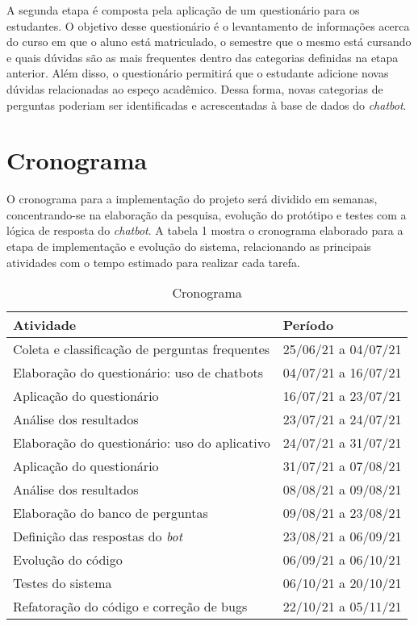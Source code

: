 \documentclass[12pt]{article}
\begin{document}
A segunda etapa é composta pela aplicação de um questionário para os estudantes. O objetivo desse questionário é o levantamento de informações acerca do curso em que o aluno está matriculado, o semestre que o mesmo está cursando e quais dúvidas são as mais frequentes dentro das categorias definidas na etapa anterior. Além disso, o questionário permitirá que o estudante adicione novas dúvidas relacionadas ao espeço acadêmico. Dessa forma, novas categorias de perguntas poderiam ser identificadas e acrescentadas à base de dados do {\itshape chatbot}.

\section{Cronograma} \label{sec:firstpage}

O cronograma para a implementação do projeto será dividido em semanas, concentrando-se na elaboração da pesquisa, evolução do protótipo e testes com a lógica de resposta do {\itshape chatbot}. A tabela 1 mostra o cronograma elaborado para a etapa de implementação e evolução do sistema, relacionando as principais atividades com o tempo estimado para realizar cada tarefa.


\begin{table}[h!]
\caption{Cronograma}
\label{table:1}
\begin{tabular}{ |p{8cm}||p{6cm}|  }
 \hline
Atividade & Período\\
 \hline
 Coleta e classificação de perguntas frequentes & 25/06/21 a 04/07/21  \\
 Elaboração do questionário: uso de chatbots & 04/07/21 a 16/07/21  \\
 Aplicação do questionário & 16/07/21 a 23/07/21  \\
 Análise dos resultados & 23/07/21 a 24/07/21  \\
 Elaboração do questionário: uso do aplicativo & 24/07/21 a 31/07/21  \\
 Aplicação do questionário & 31/07/21 a 07/08/21  \\
 Análise dos resultados & 08/08/21 a 09/08/21  \\
 Elaboração do banco de perguntas & 09/08/21 a 23/08/21  \\
 Definição das respostas do {\itshape bot} & 23/08/21 a 06/09/21  \\
 Evolução do código & 06/09/21 a 06/10/21 \\
 Testes do sistema & 06/10/21 a 20/10/21  \\
 Refatoração do código e correção de bugs & 22/10/21 a 05/11/21\\
 \hline
\end{tabular}
\end{table}
\end{document}
